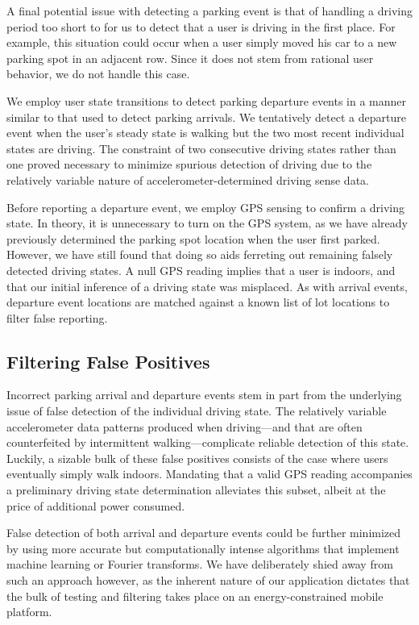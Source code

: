 A final potential issue with detecting a parking event is that of handling a
driving period too short to for us to detect that a user is driving in the first
place. For example, this situation could occur when a user simply moved his car
to a new parking spot in an adjacent row. Since it does not stem from rational
user behavior, we do not handle this case.

We employ user state transitions to detect parking departure events in a
manner similar to that used to detect parking arrivals. We tentatively detect a
departure event when the user's steady state is walking but the two most recent
individual states are driving. The constraint of two consecutive driving states
rather than one proved necessary to minimize spurious detection of driving due
to the relatively variable nature of accelerometer-determined driving sense
data.

Before reporting a departure event, we employ GPS sensing to confirm a driving
state. In theory, it is unnecessary to turn on the GPS system, as we have
already previously determined the parking spot location when the user first
parked. However, we have still found that doing so aids ferreting out remaining
falsely detected driving states. A null GPS reading implies that a user is
indoors, and that our initial inference of a driving state was misplaced. As
with arrival events, departure event locations are matched against a known list
of lot locations to filter false reporting.

\subsection{Filtering False Positives}
\label{subsec-false}

Incorrect parking arrival and departure events stem in part from the
underlying issue of false detection of the individual driving state. The
relatively variable accelerometer data patterns produced when driving---and
that are often counterfeited by intermittent walking---complicate reliable
detection of this state. Luckily, a sizable bulk of these false positives
consists of the case where users eventually simply walk indoors. Mandating
that a valid GPS reading accompanies a preliminary driving state
determination alleviates this subset, albeit at the price of additional
power consumed.

False detection of both arrival and departure events could be further
minimized by using more accurate but computationally intense algorithms that
implement machine learning or Fourier transforms. We have deliberately shied
away from such an approach however, as the inherent nature of our application
dictates that the bulk of testing and filtering takes place on an
energy-constrained mobile platform.
